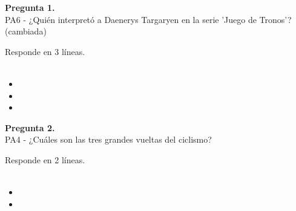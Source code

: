 \documentclass[12pt,a4paper,twoside]{article}
\begin{document}
        
        
            \noindent\parbox[t]{\textwidth}
                {
                    \textbf{Pregunta 1.} \\
                    {
                        PA6 - ¿Quién interpretó a Daenerys Targaryen en la serie 'Juego de Tronos'? (cambiada)\\
                    }\par\noindent Responde en 3 líneas.\\
                \\
                }
                \begin{itemize}[left=1.5cm,label={}, itemsep=0.02em] 
                
                    \item
                
                    \item
                
                    \item
                
                \end{itemize}
        
            \noindent\parbox[t]{\textwidth}
                {
                    \textbf{Pregunta 2.} \\
                    {
                        PA4 - ¿Cuáles son las tres grandes vueltas del ciclismo?\\
                    }\par\noindent Responde en 2 líneas.\\
                \\
                }
                \begin{itemize}[left=1.5cm,label={}, itemsep=0.02em] 
                
                    \item
                
                    \item
                
                \end{itemize}
        
\end{document}
